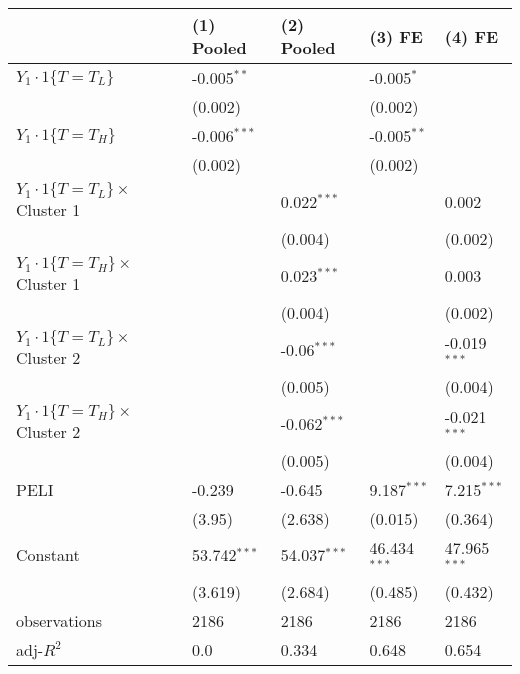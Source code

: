 \begin{tabular}{lllll}
\hline
 & (1) Pooled & (2) Pooled & (3) FE & (4) FE \\
\hline
$Y_1\cdot1\{T=T_L\}$ & -0.005$^{**}$ &  & -0.005$^{*}$ &  \\
 & (0.002) &  & (0.002) &  \\
$Y_1\cdot1\{T=T_H\}$ & -0.006$^{***}$ &  & -0.005$^{**}$ &  \\
 & (0.002) &  & (0.002) &  \\
$Y_1\cdot1\{T=T_L\}\times$ Cluster 1 &  & 0.022$^{***}$ &  & 0.002 \\
 &  & (0.004) &  & (0.002) \\
$Y_1\cdot1\{T=T_H\}\times$ Cluster 1 &  & 0.023$^{***}$ &  & 0.003 \\
 &  & (0.004) &  & (0.002) \\
$Y_1\cdot1\{T=T_L\}\times$ Cluster 2 &  & -0.06$^{***}$ &  & -0.019$^{***}$ \\
 &  & (0.005) &  & (0.004) \\
$Y_1\cdot1\{T=T_H\}\times$ Cluster 2 &  & -0.062$^{***}$ &  & -0.021$^{***}$ \\
 &  & (0.005) &  & (0.004) \\
PELI & -0.239 & -0.645 & 9.187$^{***}$ & 7.215$^{***}$ \\
 & (3.95) & (2.638) & (0.015) & (0.364) \\
Constant & 53.742$^{***}$ & 54.037$^{***}$ & 46.434$^{***}$ & 47.965$^{***}$ \\
 & (3.619) & (2.684) & (0.485) & (0.432) \\\hline

observations & 2186 & 2186 & 2186 & 2186 \\
adj-$R^2$ & 0.0 & 0.334 & 0.648 & 0.654 \\
\hline
\end{tabular}
